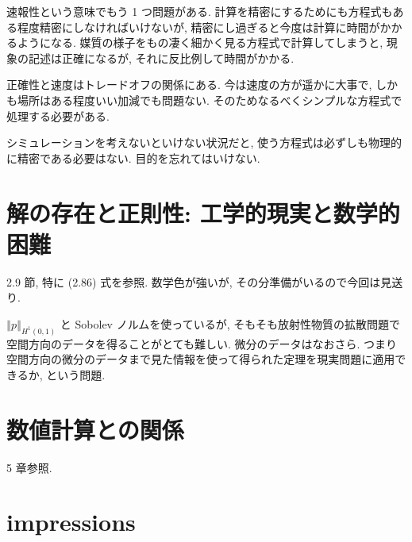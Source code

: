 \documentclass[openany, a4paper, oneside]{jsbook}
\theoremstyle{break}
\theoremstyle{breakdefn}
\newcommand{\norm}[1]{\left\Vert#1\right\Vert}
\begin{document}
速報性という意味でもう 1 つ問題がある.
計算を精密にするためにも方程式もある程度精密にしなければいけないが, 精密にし過ぎると今度は計算に時間がかかるようになる.
媒質の様子をもの凄く細かく見る方程式で計算してしまうと, 現象の記述は正確になるが, それに反比例して時間がかかる.

正確性と速度はトレードオフの関係にある.
今は速度の方が遥かに大事で, しかも場所はある程度いい加減でも問題ない.
そのためなるべくシンプルな方程式で処理する必要がある.

シミュレーションを考えないといけない状況だと, 使う方程式は必ずしも物理的に精密である必要はない.
目的を忘れてはいけない.
\section{解の存在と正則性: 工学的現実と数学的困難}


\cite{NoborizakaOnishiYamamoto1} 2.9 節, 特に (2.86) 式を参照.
数学色が強いが, その分準備がいるので今回は見送り.

$\norm{p}_{H^1 (0,1)}$ と Sobolev ノルムを使っているが,
そもそも放射性物質の拡散問題で空間方向のデータを得ることがとても難しい.
微分のデータはなおさら.
つまり空間方向の微分のデータまで見た情報を使って得られた定理を現実問題に適用できるか, という問題.
\section{数値計算との関係}


\cite{KimYamamoto1} 5 章参照.
\section{impressions}
\end{document}

